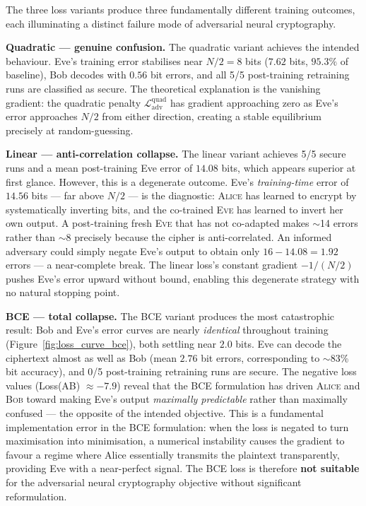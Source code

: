 \documentclass[12pt, a4paper]{article}
\newcommand{\alice}{\textsc{Alice}}
\newcommand{\bob}{\textsc{Bob}}
\newcommand{\eve}{\textsc{Eve}}
\begin{document}
The three loss variants produce three fundamentally different training
outcomes, each illuminating a distinct failure mode of adversarial
neural cryptography.

\textbf{Quadratic --- genuine confusion.}
The quadratic variant achieves the intended
behaviour. Eve's training error stabilises near $N/2 = 8$ bits
($7.62$ bits, $95.3\%$ of baseline), Bob decodes with $0.56$ bit errors, and
all 5/5 post-training retraining runs are classified as secure. The
theoretical explanation is the vanishing gradient: the quadratic
penalty $\mathcal{L}_{\mathrm{adv}}^{\mathrm{quad}}$ has gradient
approaching zero as Eve's error approaches $N/2$ from either direction,
creating a stable equilibrium precisely at random-guessing.

\textbf{Linear --- anti-correlation collapse.}
The linear variant achieves 5/5 secure runs and a mean post-training
Eve error of $14.08$ bits, which appears superior at first glance. However, this is a
degenerate outcome. Eve's \emph{training-time} error of $14.56$ bits
--- far above $N/2$ --- is the diagnostic: \alice{} has learned to
encrypt by systematically inverting bits, and the co-trained \eve{}
has learned to invert her own output. A post-training fresh \eve{}
that has not co-adapted makes $\sim$14 errors rather than $\sim$8
precisely because the cipher is anti-correlated. An informed adversary
could simply negate Eve's output to obtain only $16 - 14.08 = 1.92$
errors --- a near-complete break. The linear loss's constant gradient
$-1/(N/2)$ pushes Eve's error upward without bound, enabling this
degenerate strategy with no natural stopping point.

\textbf{BCE --- total collapse.}
The BCE variant produces the most catastrophic result: Bob and Eve's
error curves are nearly \emph{identical} throughout training
(Figure~\ref{fig:loss_curve_bce}), both settling near $2.0$ bits.
Eve can decode the ciphertext almost as well as Bob (mean $2.76$ bit
errors, corresponding to $\sim$83\% bit accuracy), and 0/5
post-training retraining runs are secure. The negative loss values
(Loss(AB) $\approx -7.9$) reveal that the BCE formulation has driven
\alice{} and \bob{} toward making Eve's output \emph{maximally
predictable} rather than maximally confused --- the opposite of the
intended objective. This is a fundamental implementation error in the
BCE formulation: when the loss is negated to turn maximisation into
minimisation, a numerical instability causes the gradient to favour
a regime where Alice essentially transmits the plaintext transparently,
providing Eve with a near-perfect signal. The BCE loss is therefore
\textbf{not suitable} for the adversarial neural cryptography
objective without significant reformulation.
\end{document}
